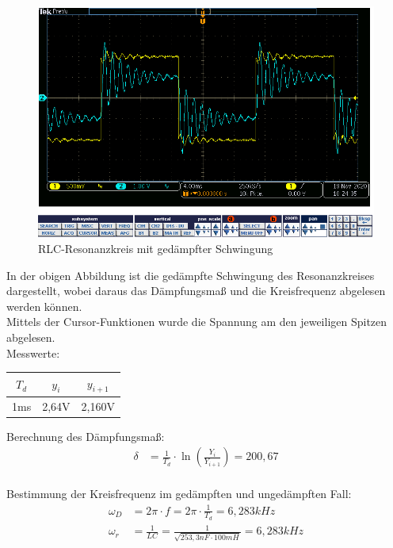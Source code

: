 \documentclass{article}
\begin{document}
  \begin{figure}[h]
    \begin{center}
      \includegraphics[scale=0.5]{../assets/images/ETP3/Aufgabe210PeriodenSchwingung.PNG}
      \caption{RLC-Resonanzkreis mit gedämpfter Schwingung}
    \end{center}
  \end{figure}

  In der obigen Abbildung ist die gedämpfte Schwingung des Resonanzkreises dargestellt, wobei daraus das Dämpfungsmaß und die Kreisfrequenz abgelesen werden können.\\
 Mittels der Cursor-Funktionen wurde die Spannung am den jeweiligen Spitzen abgelesen.\\
Messwerte:
\begin{table}[h]
  \begin{center}

    \begin{tabular}{|c|c|c|}
      \hline
      $T_d$ & $y_i$ & $y_{i+1}$ \\
      \hline
      1ms   & 2,64V & 2,160V    \\
      \hline
    \end{tabular}
  \end{center}
\end{table}
\newpage
Berechnung des Dämpfungsmaß:
\begin{align*}
  \delta   & = \frac{1}{T_d} \cdot \ln \left(\frac{Y_i}{Y_{i+1}}\right) = 200,67      \\
\end{align*}

Bestimmung der Kreisfrequenz im gedämpften und ungedämpften Fall: 
\begin{align*}
\omega_D   & = 2\pi \cdot f = 2\pi \cdot \frac{1}{T_d} = 6,283kHz \\
\omega_r   & = \frac{1}{LC} = \frac{1}{\sqrt{253,3nF \cdot 100mH}} = 6,283kHz
\end{align*}
\end{document}
